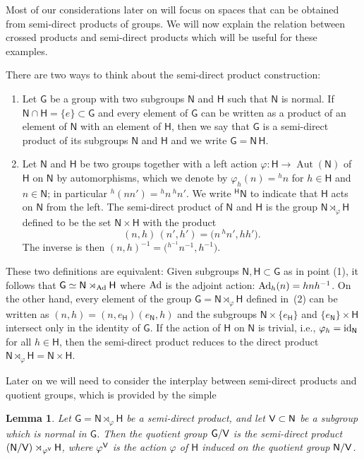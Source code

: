 \documentclass[pdftex]{sigma}
\numberwithin{equation}{section}
\def\V{{\sf V}}
\newcommand{\sfG}{\mathsf{G}}
\newcommand{\sfH}{\mathsf{H}}
\newcommand{\sfN}{\mathsf{N}}
\newcommand{\Aut}{\operatorname{Aut}}
\newtheorem{Lemma}[Theorem]{Lemma}
\begin{document}
Most of our considerations later on will focus on spaces that can be
obtained from semi-direct products of groups. We will now explain the
relation between crossed products and semi-direct products which will
be useful for these examples.

There are two ways to think about the semi-direct product construction:
\begin{enumerate}\itemsep=0pt
\item[(1)] Let $\sfG$ be a
group with two subgroups $\sfN $ and $\sfH$ such that $\sfN $ is normal. If $\sfN \cap
\sfH=\{e\}\subset \sfG$ and every
element of $\sfG$ can be written as a product of an element of
$\sfN $ with an element of $\sfH$, then we say that $\sfG$ is a semi-direct
product of its subgroups $\sfN $ and $\sfH$ and we write $\sfG=\sfN \,\sfH$.

\item[(2)]
Let $\sfN $ and $\sfH$ be two groups together with a left action
$\varphi\colon \sfH\to\Aut(\sfN )$ of $\sfH$ on $\sfN $ by automorphisms, which we denote by
$\varphi_h(n)={}^hn$ for $h\in \sfH$ and $n\in \sfN $; in particular
${}^h(n n')={}^hn\, {}^hn'$. We write ${}^\sfH \sfN $ to
indicate that $\sfH $ acts on $\sfN $ from the left. The semi-direct product
of $\sfN $ and $\sfH $ is the group $\sfN \rtimes_\varphi \sfH $ defined to be the set
$\sfN \times \sfH $ with the product
\[
(n,h)\,(n',h') = \big(n\,{}^hn',h h'\big) .
\]
The inverse is then $(n,h)^{-1}=\big({}^{h^{-1\!}}{n^{-1}},h^{-1}\big)$.
\end{enumerate}
These two definitions are equivalent: Given subgroups $\sfN ,\sfH \subset \sfG$ as
in point (1), it follows that $\sfG\simeq \sfN \rtimes_{\rm Ad} \sfH $
where ${\rm Ad}$ is the adjoint action: ${\rm Ad}_h(n)=h n h^{-1}$. On the other
hand, every element of the group $\sfG=\sfN \rtimes_\varphi \sfH $ defined in~(2) can be written as $(n,h)=(n,e_\sfH) (e_\sfN,h)$ and the subgroups $\sfN \times\{e_\sfH\}$
and $\{e_\sfN\} \times \sfH $ intersect only in the identity of $\sfG$.
If the action of $\sfH $ on $\sfN $ is trivial,
i.e., $\varphi_h={\rm id}_\sfN $ for all $h\in \sfH $, then the semi-direct
product reduces to the direct product $\sfN \rtimes_\varphi
\sfH =\sfN \times \sfH $.

Later on we will need to consider the interplay between semi-direct
products and quotient groups, which is provided by the simple
\begin{Lemma}
\label{lem:semidirectquotient}
Let $\sfG=\sfN\rtimes_\varphi\sfH$ be a semi-direct
product, and let $\V\subset \sfN$ be a subgroup which is normal in
$\sfG$. Then the quotient group $\sfG/\V$ is the
semi-direct product $(\sfN/\V)\rtimes_{\varphi^\V}\sfH$, where
${\varphi^\V}$ is the action $\varphi$ of $\sfH$ induced on the
quotient group $\sfN/\V$.
\end{Lemma}
\end{document}
